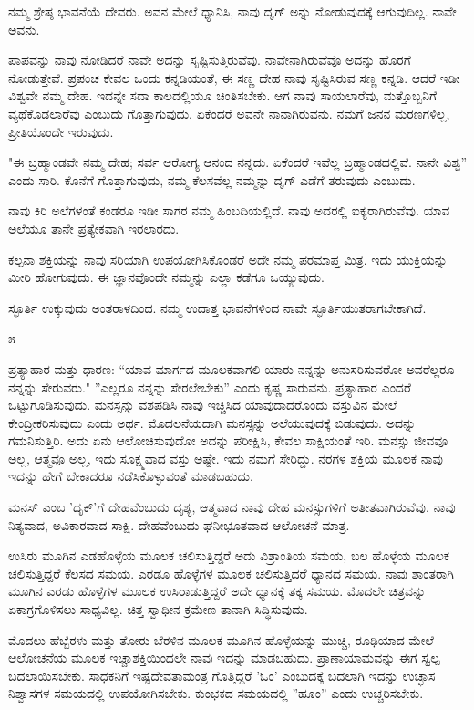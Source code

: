 ನಮ್ಮ ಶ್ರೇಷ್ಠ ಭಾವನೆಯೆ ದೇವರು. ಅವನ ಮೇಲೆ ಧ್ಯಾನಿಸಿ, ನಾವು ದೃಗ್ ಅನ್ನು ನೋಡುವುದಕ್ಕೆ ಆಗುವುದಿಲ್ಲ. ನಾವೇ ಅವನು.

ಪಾಪವನ್ನು ನಾವು ನೋಡಿದರೆ ನಾವೇ ಅದನ್ನು ಸೃಷ್ಟಿಸುತ್ತಿರುವೆವು. ನಾವೇನಾಗಿರುವೆವೊ ಅದನ್ನು ಹೊರಗೆ ನೋಡುತ್ತೇವೆ. ಪ್ರಪಂಚ ಕೇವಲ ಒಂದು ಕನ್ನಡಿಯಂತೆ, ಈ ಸಣ್ಣ ದೇಹ ನಾವು ಸೃಷ್ಟಿಸಿರುವ ಸಣ್ಣ ಕನ್ನಡಿ. ಆದರೆ ಇಡೀ ವಿಶ್ವವೇ ನಮ್ಮ ದೇಹ. ಇದನ್ನೇ ಸದಾ ಕಾಲದಲ್ಲಿಯೂ ಚಿಂತಿಸಬೇಕು. ಆಗ ನಾವು ಸಾಯಲಾರೆವು, ಮತ್ತೊಬ್ಬನಿಗೆ ವ್ಯಥೆಕೊಡಲಾರೆವು ಎಂಬುದು ಗೊತ್ತಾಗುವುದು. ಏಕೆಂದರೆ ಅವನೇ ನಾನಾಗಿರುವನು. ನಮಗೆ ಜನನ ಮರಣಗಳಿಲ್ಲ, ಪ್ರೀತಿಯೊಂದೇ ಇರುವುದು.

"ಈ ಬ್ರಹ್ಮಾಂಡವೇ ನಮ್ಮ ದೇಹ; ಸರ್ವ ಆರೋಗ್ಯ ಆನಂದ ನನ್ನದು. ಏಕೆಂದರೆ ಇವೆಲ್ಲ ಬ್ರಹ್ಮಾಂಡದಲ್ಲಿವೆ. ನಾನೇ ವಿಶ್ವ'' ಎಂದು ಸಾರಿ. ಕೊನೆಗೆ ಗೊತ್ತಾಗುವುದು, ನಮ್ಮ ಕೆಲಸವೆಲ್ಲ ನಮ್ಮನ್ನು ದೃಗ್ ಎಡೆಗೆ ತರುವುದು ಎಂಬುದು.

ನಾವು ಕಿರಿ ಅಲೆಗಳಂತೆ ಕಂಡರೂ ಇಡೀ ಸಾಗರ ನಮ್ಮ ಹಿಂಬದಿಯಲ್ಲಿದೆ. ನಾವು ಅದರಲ್ಲಿ ಐಕ್ಯರಾಗಿರುವೆವು. ಯಾವ ಅಲೆಯೂ ತಾನೇ ಪ್ರತ್ಯೇಕವಾಗಿ ಇರಲಾರದು.

ಕಲ್ಪನಾ ಶಕ್ತಿಯನ್ನು ನಾವು ಸರಿಯಾಗಿ ಉಪಯೋಗಿಸಿಕೊಂಡರೆ ಅದೇ ನಮ್ಮ ಪರಮಾಪ್ತ ಮಿತ್ರ. ಇದು ಯುಕ್ತಿಯನ್ನು ಮೀರಿ ಹೋಗುವುದು. ಈ ಜ್ಞಾನವೊಂದೇ ನಮ್ಮನ್ನು ಎಲ್ಲಾ ಕಡೆಗೂ ಒಯ್ಯುವುದು.

ಸ್ಫೂರ್ತಿ ಉಕ್ಕುವುದು ಅಂತರಾಳದಿಂದ. ನಮ್ಮ ಉದಾತ್ತ ಭಾವನೆಗಳಿಂದ ನಾವೇ ಸ್ಫೂರ್ತಿಯುತರಾಗಬೇಕಾಗಿದೆ.

\begin{center}
೫
\end{center}

ಪ್ರತ್ಯಾಹಾರ ಮತ್ತು ಧಾರಣ: “ಯಾವ ಮಾರ್ಗದ ಮೂಲಕವಾಗಲಿ ಯಾರು ನನ್ನನ್ನು ಅನುಸರಿಸುವರೋ ಅವರೆಲ್ಲರೂ ನನ್ನನ್ನು ಸೇರುವರು." ''ಎಲ್ಲರೂ ನನ್ನನ್ನು ಸೇರಲೇಬೇಕು'' ಎಂದು ಕೃಷ್ಣ ಸಾರುವನು. ಪ್ರತ್ಯಾಹಾರ ಎಂದರೆ ಒಟ್ಟುಗೂಡಿಸುವುದು. ಮನಸ್ಸನ್ನು ವಶಪಡಿಸಿ ನಾವು ಇಚ್ಚಿಸಿದ ಯಾವುದಾದರೊಂದು ವಸ್ತುವಿನ ಮೇಲೆ ಕೇಂದ್ರೀಕರಿಸುವುದು ಎಂದು ಅರ್ಥ. ಮೊದಲನೆಯದಾಗಿ ಮನಸ್ಸನ್ನು ಅಲೆಯುವುದಕ್ಕೆ ಬಿಡುವುದು. ಅದನ್ನು ಗಮನಿಸುತ್ತಿರಿ. ಅದು ಏನು ಆಲೋಚಿಸುವುದೋ ಅದನ್ನು ಪರೀಕ್ಷಿಸಿ, ಕೇವಲ ಸಾಕ್ಷಿಯಂತೆ ಇರಿ. ಮನಸ್ಸು ಜೀವವೂ ಅಲ್ಲ, ಆತ್ಮವೂ ಅಲ್ಲ, ಇದು ಸೂಕ್ಷ್ಮವಾದ ವಸ್ತು ಅಷ್ಟೇ. ಇದು ನಮಗೆ ಸೇರಿದ್ದು. ನರಗಳ ಶಕ್ತಿಯ ಮೂಲಕ ನಾವು ಇದನ್ನು ಹೇಗೆ ಬೇಕಾದರೂ ನಡೆಸಿಕೊಳ್ಳುವಂತೆ ಮಾಡಬಹುದು.

ಮನಸ್ ಎಂಬ 'ದೃಕ್'ಗೆ ದೇಹವೆಂಬುದು ದೃಶ್ಯ, ಆತ್ಮವಾದ ನಾವು ದೇಹ ಮನಸ್ಸುಗಳಿಗೆ ಅತೀತವಾಗಿರುವೆವು. ನಾವು ನಿತ್ಯವಾದ, ಅವಿಕಾರವಾದ ಸಾಕ್ಷಿ. ದೇಹವೆಂಬುದು ಘನೀಭೂತವಾದ ಆಲೋಚನೆ ಮಾತ್ರ.

ಉಸಿರು ಮೂಗಿನ ಎಡಹೊಳ್ಳೆಯ ಮೂಲಕ ಚಲಿಸುತ್ತಿದ್ದರೆ ಅದು ವಿಶ್ರಾಂತಿಯ ಸಮಯ, ಬಲ ಹೊಳ್ಳೆಯ ಮೂಲಕ ಚಲಿಸುತ್ತಿದ್ದರೆ ಕೆಲಸದ ಸಮಯ. ಎರಡೂ ಹೊಳ್ಳೆಗಳ ಮೂಲಕ ಚಲಿಸುತ್ತಿದರೆ ಧ್ಯಾನದ ಸಮಯ. ನಾವು ಶಾಂತರಾಗಿ ಮೂಗಿನ ಎರಡು ಹೊಳ್ಳೆಗಳ ಮೂಲಕ ಉಸಿರಾಡುತ್ತಿದ್ದರೆ ಅದೇ ಧ್ಯಾನಕ್ಕೆ ತಕ್ಕ ಸಮಯ. ಮೊದಲೇ ಚಿತ್ರವನ್ನು ಏಕಾಗ್ರಗೊಳಿಸಲು ಸಾಧ್ಯವಿಲ್ಲ. ಚಿತ್ತ ಸ್ವಾಧೀನ ಕ್ರಮೇಣ ತಾನಾಗಿ ಸಿದ್ಧಿಸುವುದು.

ಮೊದಲು ಹೆಬ್ಬೆರಳು ಮತ್ತು ತೋರು ಬೆರಳಿನ ಮೂಲಕ ಮೂಗಿನ ಹೊಳ್ಳೆಯನ್ನು ಮುಚ್ಚಿ, ರೂಢಿಯಾದ ಮೇಲೆ ಆಲೋಚನೆಯ ಮೂಲಕ ಇಚ್ಚಾಶಕ್ತಿಯಿಂದಲೇ ನಾವು ಇದನ್ನು ಮಾಡಬಹುದು. ಪ್ರಾಣಾಯಾಮವನ್ನು ಈಗ ಸ್ವಲ್ಪ ಬದಲಾಯಿಸಬೇಕು. ಸಾಧಕನಿಗೆ ಇಷ್ಟದೇವತಾಮಂತ್ರ ಗೊತ್ತಿದ್ದರೆ 'ಓಂ' ಎಂಬುದಕ್ಕೆ ಬದಲಾಗಿ ಇದನ್ನು ಉಚ್ಛಾಸ ನಿಶ್ವಾಸಗಳ ಸಮಯದಲ್ಲಿ ಉಪಯೋಗಿಸಬೇಕು. ಕುಂಭಕದ ಸಮಯದಲ್ಲಿ ''ಹೂಂ'' ಎಂದು ಉಚ್ಚರಿಸಬೇಕು.


